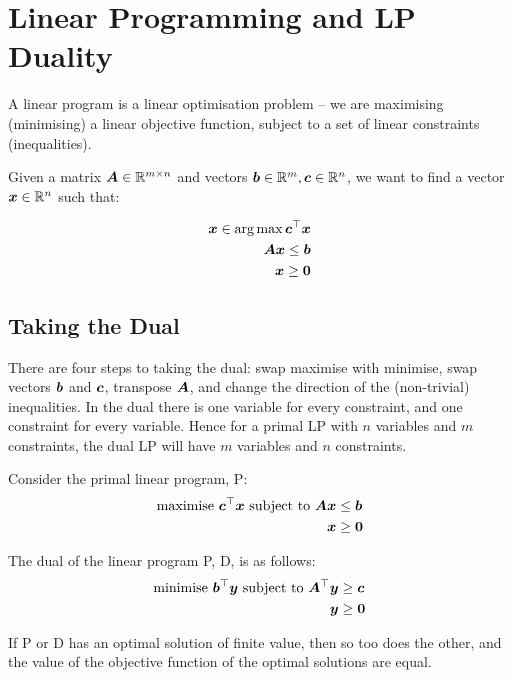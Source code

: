 \section{Linear Programming and LP Duality}
	A linear program is a linear optimisation problem -- we are maximising
	(minimising) a linear objective function, subject to a set of linear
	constraints (inequalities).

	\begin{definition}
		Given a matrix $\bm{A} \in \mathbb{R}^{m \times n}$ and vectors
		$\bm{b} \in \mathbb{R}^m, \bm{c} \in \mathbb{R}^n$, we want to
		find a vector $\bm{x} \in \mathbb{R}^n$ such that:
		
		\begin{equation}
			\begin{split}
				\bm{x} \in \operatorname*{arg\,max} \bm{c}^\top \bm{x} \\
				\bm{A}\bm{x} \le \bm{b} \\
				\bm{x} \ge \bm{0}
			\end{split}
		\end{equation}
	\end{definition}

	\subsection{Taking the Dual}
		There are four steps to taking the dual: swap maximise with minimise,
		swap vectors $\bm{b}$ and $\bm{c}$, transpose $\bm{A}$, and
		change the direction of the (non-trivial) inequalities. In the dual
		there is one variable for every constraint, and one constraint for
		every variable. Hence for a primal LP with $n$ variables and $m$
		constraints, the dual LP will have $m$ variables and $n$ constraints.

		Consider the primal linear program, P:
		\begin{equation}
			\begin{split}
				\text{maximise } \bm{c}^\top \bm{x} \text{ subject to }
				\bm{A}\bm{x} & \le \bm{b} \\
				\bm{x} & \ge \bm{0}
			\end{split}
		\end{equation}
	
		The dual of the linear program P, D, is as follows:
		\begin{equation}
			\begin{split}
				\text{minimise } \bm{b}^\top \bm{y} \text{ subject to }
				\bm{A}^\top \bm{y} & \ge \bm{c} \\
				\bm{y} & \ge \bm{0}
			\end{split}
		\end{equation}

		\begin{theorem}
			If P or D has an optimal solution of finite value, then so too does
			the other, and the value of the objective function of the optimal
			solutions are equal.
		\end{theorem}
